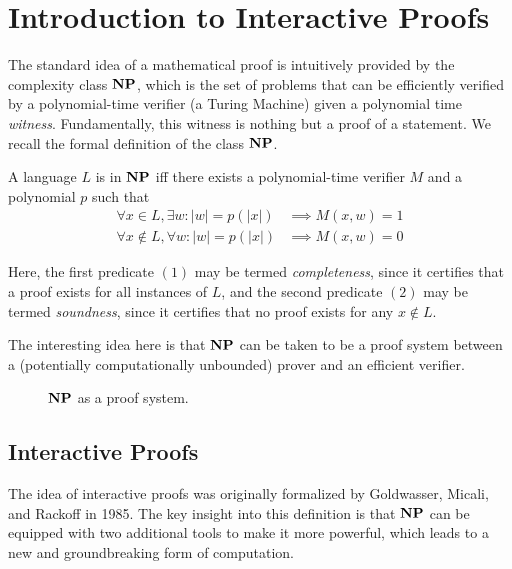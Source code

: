 \section{Introduction to Interactive Proofs}

The standard idea of a mathematical proof is intuitively provided by the complexity class $\mathbf{NP}$, which is the set of problems that can be efficiently verified by a polynomial-time verifier (a Turing Machine) given a polynomial time \textit{witness}. Fundamentally, this witness is nothing but a proof of a statement. We recall the formal definition of the class $\mathbf{NP}$.

\begin{definition}[$\np.$]
	A language $L$ is in $\mathbf{NP}$ iff there exists a polynomial-time verifier $M$ and a polynomial $p$ such that
	\begin{align}
		\forall x\in L, \exists w:|w|=p(|x|)&\implies M(x, w)=1\\
		\forall x\notin L, \forall w:|w|=p(|x|)&\implies M(x,w)=0
	\end{align}
\end{definition}

Here, the first predicate $(1)$ may be termed \textit{completeness}, since it certifies that a proof exists for all instances of $L$, and the second predicate $(2)$ may be termed \textit{soundness}, since it certifies that no proof exists for any $x\notin L$.

The interesting idea here is that $\mathbf{NP}$ can be taken to be a proof system between a (potentially computationally unbounded) prover and an efficient verifier.

\begin{figure}[h]
	\centering
	
	\caption{$\mathbf{NP}$ as a proof system.}
\end{figure}

\subsection{Interactive Proofs}
The idea of interactive proofs was originally formalized by Goldwasser, Micali, and Rackoff \cite{10.1145/22145.22178} in 1985. The key insight into this definition is that $\mathbf{NP}$ can be equipped with two additional tools to make it more powerful, which leads to a new and groundbreaking form of computation.

